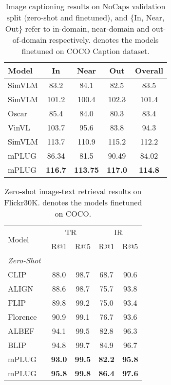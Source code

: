 \documentclass[11pt]{article}
\begin{document}
\begin{table}[t]
\setlength\tabcolsep{3pt}
\centering
\begin{tabular}{lcccc}
\toprule
Model & In & Near & Out & Overall \\
\midrule
SimVLM\cite{wang2021simvlm}  & 83.2 & 84.1 & 82.5 & 83.5 \\
SimVLM\cite{wang2021simvlm} & 101.2 & 100.4 & 102.3 & 101.4 \\
Oscar\cite{li2020oscar} & 85.4 & 84.0 & 80.3 & 83.4 \\
VinVL\cite{zhang2021vinvl} & 103.7 & 95.6 & 83.8 & 94.3 \\
SimVLM\cite{wang2021simvlm} & 113.7 & 110.9 & 115.2 & 112.2  \\
\midrule
mPLUG & 86.34 & 81.5 & 90.49 & 84.02 \\
mPLUG  & \textbf{116.7}  & \textbf{113.75} & \textbf{117.0}  & \textbf{114.8} \\
\bottomrule
\end{tabular}
\caption{Image captioning results on NoCaps validation split (zero-shot and finetuned), and \{In, Near, Out\} refer to in-domain, near-domain and out-of-domain respectively.  denotes the models finetuned on COCO Caption dataset.}
\label{table:zero-shot-nocaps}
\end{table}


\begin{table}[t]
\centering
\begin{tabular}{l|cccc}
\toprule
\multicolumn{1}{l|}{\multirow{2}{*}{Model}}      &
\multicolumn{2}{c}{TR} & \multicolumn{2}{c}{IR}  \\
    & R@1 & R@5 & R@1 & R@5 \\
\midrule
\multicolumn{5}{l}{\emph{Zero-Shot}} \\
\midrule
CLIP~\cite{radford2021learning}    &88.0& 98.7&68.7&90.6  \\
ALIGN ~\cite{jia2021scaling}     &88.6& 98.7&75.7&93.8  \\
FLIP ~\cite{yao2021filip} & 89.8 & 99.2 & 75.0 & 93.4 \\ 
Florence ~\cite{yuan2021florence} & 90.9 & 99.1 &76.7 &93.6\\
ALBEF   ~\cite{li2021align} & 94.1 & 99.5&82.8& 96.3 \\
BLIP ~\cite{li2022blip} &94.8& 99.7  &84.9& 96.7                 \\
\midrule
mPLUG   & \textbf{93.0} &\textbf{99.5}& \textbf{82.2}&\textbf{95.8}  \\
mPLUG   & \textbf{95.8} &\textbf{99.8}& \textbf{86.4}&\textbf{97.6}  \\
\bottomrule
\end{tabular}
\caption{Zero-shot image-text retrieval results on Flickr30K.  denotes the models finetuned on COCO. }
\label{table:zero-shot-image-retrieval}
\end{table}
\end{document}
